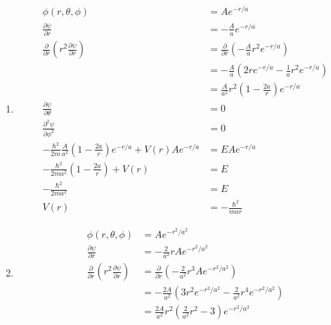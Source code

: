\documentclass{article}
\begin{document}
\subsection{}

\begin{enumerate}
  \item 

  \begin{align*}
    \phi(r, \theta, \phi) &= A e^{-r / a} \\
    \frac{\partial \psi}{\partial r} &= -\frac{A}{a} e^{-r / a} \\
    \frac{\partial}{\partial r} \left( r^2 \frac{\partial \psi}{\partial r} \right) &= \frac{\partial}{\partial r} \left( -\frac{A}{a} r^2 e^{-r / a} \right) \\
    &= -\frac{A}{a} \left( 2 r e^{-r / a} - \frac{1}{a} r^2 e^{-r / a} \right) \\
    &= \frac{A}{a^2} r^2 \left( 1 - \frac{2 a}{r} \right) e^{-r / a} \\
    \frac{\partial \psi}{\partial \theta} &= 0 \\
    \frac{\partial^2 \psi}{\partial \phi^2} &= 0 \\
    -\frac{\hbar^2}{2 m} \frac{A}{a^2} \left( 1 - \frac{2 a}{r} \right) e^{-r / a} + V(r) A e^{-r / a} &= E A e^{-r / a} \\
    -\frac{\hbar^2}{2 m a^2} \left( 1 - \frac{2 a}{r} \right) + V(r) &= E \\
    -\frac{\hbar^2}{2 m a^2} &= E \\
    V(r) &= -\frac{\hbar^2}{m a r}
  \end{align*}

  \item

  \begin{align*}
    \phi(r, \theta, \phi) &= A e^{-r^2 / a^2} \\
    \frac{\partial \psi}{\partial r} &= -\frac{2}{a^2} r A e^{-r^2 / a^2} \\
    \frac{\partial}{\partial r} \left( r^2 \frac{\partial \psi}{\partial r} \right) &= \frac{\partial}{\partial r} \left( -\frac{2}{a^2} r^3 A e^{-r^2 / a^2} \right) \\
    &= -\frac{2 A}{a^2} \left( 3 r^2 e^{-r^2 / a^2} - \frac{2}{a^2} r^4 e^{-r^2 / a^2} \right) \\
    &= \frac{2 A}{a^2} r^2 \left( \frac{2}{a^2} r^2 - 3 \right) e^{-r^2 / a^2}
  \end{align*}


\end{enumerate}
\end{document}
